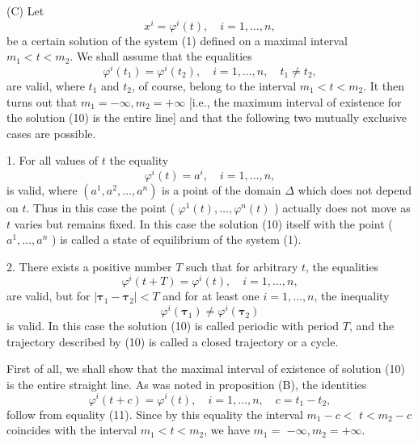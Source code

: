 \documentclass[10pt,a5paper]{book}
\theoremstyle{plain}
\theoremstyle{definition}
\theoremstyle{remark}
\begin{document}
(C) Let
\begin{equation*}
x^{i}=\varphi^{i}(t), \quad i=1, \ldots, n, \tag{10}
\end{equation*}
be a certain solution of the system (1) defined on a maximal interval $m_{1}<t<m_{2}$. We shall assume that the equalities
\begin{equation*}
\varphi^{i}\left(t_{1}\right)=\varphi^{i}\left(t_{2}\right), \quad i=1, \ldots, n, \quad t_{1} \neq t_{2}, \tag{11}
\end{equation*}
are valid, where $t_{1}$ and $t_{2}$, of course, belong to the interval $m_{1}<t<m_{2}$. It then turns out that $m_{1}=-\infty, m_{2}=+\infty$ [i.e., the maximum interval of existence for the solution (10) is the entire line] and that the following two mutually exclusive cases are possible.

1. For all values of $t$ the equality
\[
\varphi^{i}(t)=a^{i}, \quad i=1, \ldots, n,
\]
is valid, where $\left(a^{1}, a^{2}, \ldots, a^{n}\right)$ is a point of the domain $\Delta$ which does not depend on $t$. Thus in this case the point ( $\varphi^{1}(t), \ldots, \varphi^{n}(t)$ ) actually does not move as $t$ varies but remains fixed. In this case the solution (10) itself with the point ( $a^{1}, \ldots, a^{n}$ ) is called a state of equilibrium of the system (1).

2. There exists a positive number $T$ such that for arbitrary $t$, the equalities
\[
\varphi^{i}(t+T)=\varphi^{i}(t), \quad i=1, \ldots, n,
\]
are valid, but for $\left|\boldsymbol{\tau}_{1}-\boldsymbol{\tau}_{2}\right|<T$ and for at least one $i=1, \ldots, n$, the inequality
\[
\varphi^{i}\left(\boldsymbol{\tau}_{1}\right) \neq \varphi^{i}\left(\boldsymbol{\tau}_{2}\right)
\]
is valid. In this case the solution (10) is called periodic with period $T$, and the trajectory described by (10) is called a closed trajectory or a cycle.

First of all, we shall show that the maximal interval of existence of solution (10) is the entire straight line. As was noted in proposition (B), the identities
\begin{equation*}
\varphi^{i}(t+c)=\varphi^{i}(t), \quad i=1, \ldots, n, \quad c=t_{1}-t_{2}, \tag{12}
\end{equation*}
follow from equality (11). Since by this equality the interval $m_{1}-c<$ $t<m_{2}-c$ coincides with the interval $m_{1}<t<m_{2}$, we have $m_{1}=$ $-\infty, m_{2}=+\infty$.
\end{document}

